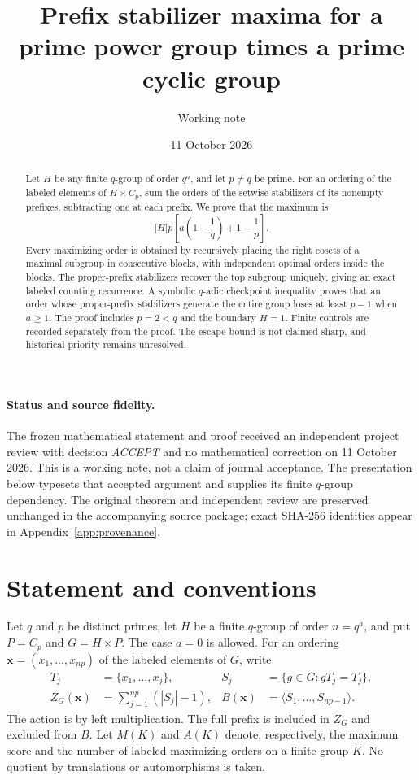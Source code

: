 \documentclass[11pt,letterpaper]{article}
\title{\bfseries Prefix stabilizer maxima for a prime power group times a prime cyclic group}
\author{Working note}
\date{11 October 2026}
\theoremstyle{definition}
\begin{document}
\maketitle
\thispagestyle{plain}
\begin{abstract}
Let $H$ be any finite $q$-group of order $q^a$, and let $p\ne q$ be prime. For an ordering of the labeled elements of $H\times C_p$, sum the orders of the setwise stabilizers of its nonempty prefixes, subtracting one at each prefix. We prove that the maximum is
\[
|H|p\left[a\left(1-\frac1q\right)+1-\frac1p\right].
\]
Every maximizing order is obtained by recursively placing the right cosets of a maximal subgroup in consecutive blocks, with independent optimal orders inside the blocks. The proper-prefix stabilizers recover the top subgroup uniquely, giving an exact labeled counting recurrence. A symbolic $q$-adic checkpoint inequality proves that an order whose proper-prefix stabilizers generate the entire group loses at least $p-1$ when $a\ge1$. The proof includes $p=2<q$ and the boundary $H=1$. Finite controls are recorded separately from the proof. The escape bound is not claimed sharp, and historical priority remains unresolved.
\end{abstract}

\paragraph{Status and source fidelity.}
The frozen mathematical statement and proof received an independent project review with decision \emph{ACCEPT} and no mathematical correction on 11 October 2026. This is a working note, not a claim of journal acceptance. The presentation below typesets that accepted argument and supplies its finite $q$-group dependency. The original theorem and independent review are preserved unchanged in the accompanying source package; exact SHA-256 identities appear in Appendix~\ref{app:provenance}.

\section{Statement and conventions}
Let $q$ and $p$ be distinct primes, let $H$ be a finite $q$-group of order $n=q^a$, and put $P=C_p$ and $G=H\times P$. The case $a=0$ is allowed. For an ordering $\mathbf{x}=(x_1,\ldots,x_{np})$ of the labeled elements of $G$, write
\begin{align}
T_j&=\{x_1,\ldots,x_j\}, &
S_j&=\{g\in G:gT_j=T_j\},\label{eq:prefix}\\
Z_G(\mathbf{x})&=\sum_{j=1}^{np}(|S_j|-1), &
B(\mathbf{x})&=\langle S_1,\ldots,S_{np-1}\rangle.\label{eq:score}
\end{align}
The action is by left multiplication. The full prefix is included in $Z_G$ and excluded from $B$. Let $M(K)$ and $A(K)$ denote, respectively, the maximum score and the number of labeled maximizing orders on a finite group $K$. No quotient by translations or automorphisms is taken.
\end{document}
